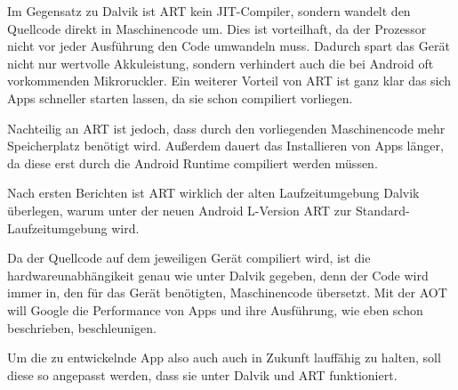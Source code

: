 Im Gegensatz zu Dalvik ist \ac{ART} kein \ac{JIT}-Compiler, sondern wandelt den Quellcode direkt in Maschinencode um. Dies ist vorteilhaft, da der Prozessor nicht vor jeder Ausf\"uhrung den Code umwandeln muss. Dadurch spart das Ger\"at nicht nur wertvolle Akkuleistung, sondern verhindert auch die bei Android oft vorkommenden Mikroruckler. 
Ein weiterer Vorteil von \ac{ART} ist ganz klar das sich Apps schneller starten lassen, da sie schon compiliert vorliegen.

Nachteilig an \ac{ART} ist jedoch, dass durch den vorliegenden Maschinencode mehr Speicherplatz ben\"otigt wird. Au\ss{}erdem dauert das Installieren von Apps l\"anger, da diese erst durch die Android Runtime compiliert werden m\"ussen. \cite{NextART} \cite{AreamobileART}

Nach ersten Berichten ist \ac{ART} wirklich der alten Laufzeitumgebung Dalvik \"uberlegen, warum unter der neuen Android L-Version \ac{ART} zur Standard-Laufzeitumgebung wird. \cite{DevART} 

Da der Quellcode auf dem jeweiligen Ger\"at compiliert wird, ist die hardwareunabh\"angikeit genau wie unter Dalvik gegeben, denn der Code wird immer in, den f\"ur das Ger\"at ben\"otigten, Maschinencode \"ubersetzt. Mit der \ac{AOT} will Google die Performance von Apps und ihre Ausf\"uhrung, wie eben schon beschrieben, beschleunigen.

Um die zu entwickelnde App also auch auch in Zukunft lauff\"ahig zu halten, soll diese so angepasst werden, dass sie unter Dalvik und \ac{ART} funktioniert.

